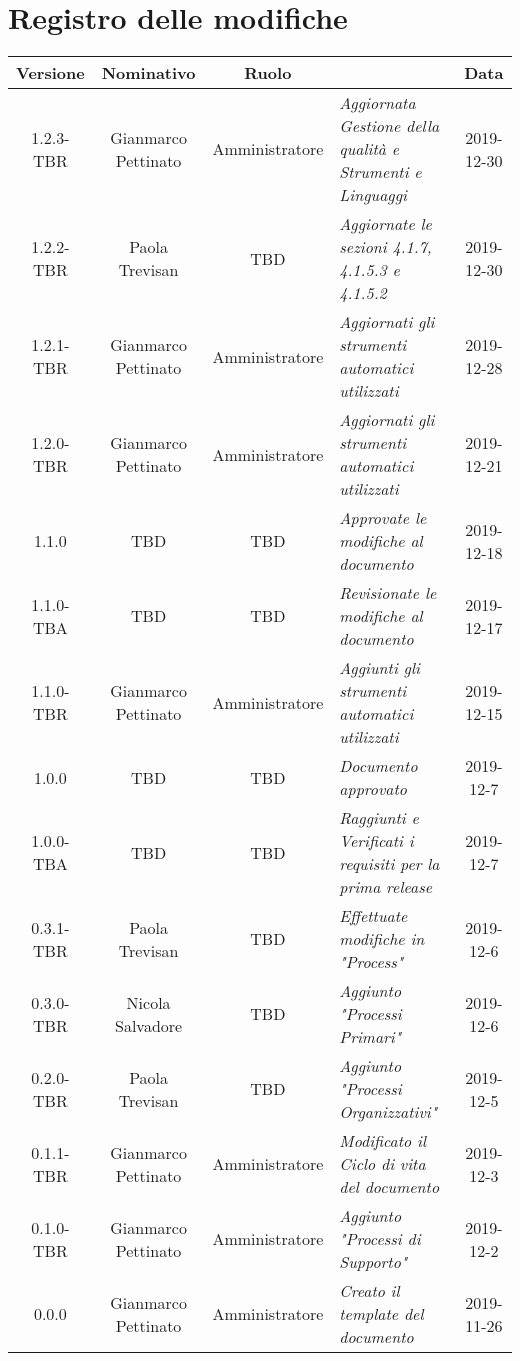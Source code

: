 \section*{Registro delle modifiche}
\renewcommand{\arraystretch}{1.8}

  \begin{longtable}{|c|c|c|p{3.8cm}|c|}
    \hline

    \rowcolor{header}
    \textbf{Versione} & \textbf{Nominativo} & \textbf{Ruolo} & \centering{\textbf{Descrizione}} & \textbf{Data}\\
    \hline
    1.2.3-TBR & Gianmarco Pettinato & Amministratore & \small{\textit{Aggiornata Gestione della qualità e Strumenti e Linguaggi}} & 2019-12-30\\
    \hline
    1.2.2-TBR & Paola Trevisan & TBD & \small{\textit{Aggiornate le sezioni 4.1.7, 4.1.5.3 e 4.1.5.2}}& 2019-12-30\\
    \hline
    1.2.1-TBR & Gianmarco Pettinato & Amministratore & \small{\textit{Aggiornati gli strumenti automatici utilizzati}}& 2019-12-28\\
    \hline
    1.2.0-TBR & Gianmarco Pettinato & Amministratore & \small{\textit{Aggiornati gli strumenti automatici utilizzati}}& 2019-12-21\\
    \hline
    1.1.0 & TBD & TBD & \small{\textit{Approvate le modifiche al documento}}& 2019-12-18\\
    \hline
    1.1.0-TBA & TBD & TBD & \small{\textit{Revisionate le modifiche al documento}} & 2019-12-17\\
    \hline
    1.1.0-TBR & Gianmarco Pettinato & Amministratore & \small{\textit{Aggiunti gli strumenti automatici utilizzati}} & 2019-12-15\\
    \hline
    1.0.0 & TBD & TBD & \small{\textit{Documento approvato}} & 2019-12-7\\
    \hline
    1.0.0-TBA & TBD & TBD &\small{\textit{Raggiunti e Verificati i requisiti per la prima release}} & 2019-12-7\\
    \hline
    0.3.1-TBR & Paola Trevisan & TBD & \small{\textit{Effettuate modifiche in "Process"}} & 2019-12-6\\
    \hline
    0.3.0-TBR & Nicola Salvadore & TBD & \small{\textit{Aggiunto "Processi Primari" }} & 2019-12-6\\
    \hline
    0.2.0-TBR & Paola Trevisan & TBD & \small{\textit{Aggiunto "Processi Organizzativi"}} & 2019-12-5\\
    \hline
    0.1.1-TBR & Gianmarco Pettinato & Amministratore & \small{\textit{Modificato il Ciclo di vita del documento}} & 2019-12-3\\
    \hline
    0.1.0-TBR & Gianmarco Pettinato & Amministratore & \small{\textit{Aggiunto "Processi di Supporto"}} & 2019-12-2\\
    \hline
    0.0.0 & Gianmarco Pettinato & Amministratore & \small{\textit{Creato il template del documento}} & 2019-11-26\\
    \hline
  \end{longtable}
